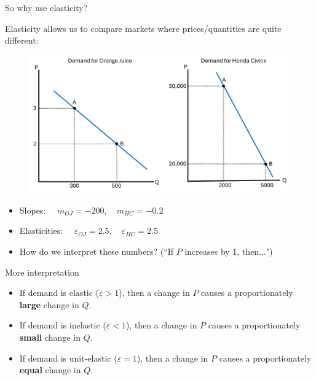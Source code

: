 \documentclass[9pt, handout]{beamer}
\begin{document}
\begin{frame}{So why use elasticity?}

    Elasticity allows us to compare markets where prices/quantities are quite different:
    \begin{figure}
        \centering
        \includegraphics[width=.8\linewidth]{demand_curve_comparison.jpg}
        \label{fig:demand_curve_comparison}
    \end{figure}
    \begin{itemize}
        \item Slopes: $\quad m_{OJ} = -200, \quad m_{HC} = -0.2$
        \item Elasticities: $\quad \varepsilon_{OJ} = 2.5, \quad \varepsilon_{HC} = 2.5$
        \item How do we interpret these numbers? (``If $P$ increases by 1, then...")
    \end{itemize}
\end{frame}

\begin{frame}{More interpretation}
    \begin{itemize}
    \item If demand is elastic ($\varepsilon > 1$), then a change in $P$ causes a proportionately \textbf{large} change in $Q$.
    \vspace{5}
    \item If demand is inelastic ($\varepsilon < 1$), then a change in $P$ causes a proportionately \textbf{small} change in $Q$.
    \vspace{5}
    \item If demand is unit-elastic ($\varepsilon = 1$), then a change in $P$ causes a proportionately \textbf{equal} change in $Q$.
    \end{itemize}
\end{frame}
\end{document}

